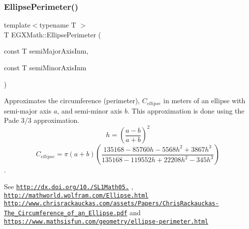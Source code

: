 \subsubsection{\texorpdfstring{Ellipse\+Perimeter()}{EllipsePerimeter()}}
{\footnotesize\ttfamily template$<$typename T $>$ \\
T E\+G\+X\+Math\+::\+Ellipse\+Perimeter (\begin{DoxyParamCaption}\item[{const T}]{semi\+Major\+Axis\+Inm,  }\item[{const T}]{semi\+Minor\+Axis\+Inm }\end{DoxyParamCaption})}



Approximates the circumference (perimeter), $C_{ellipse}$ in meters of an ellipse with semi-\/major axis $a$, and semi-\/minor axis $b$. This approximation is done using the Pade 3/3 approximation. \[ h=\left( \frac{a-b}{a+b} \right)^2 \] \[ C_{ellipse}=\pi (a + b) \left( \frac{135168-85760 h-5568 h^2+ 3867 h^3}{135168-119552 h+ 22208 h^2 - 345h^3} \right) \]. 

See \href{http://dx.doi.org/10.3247/SL1Math05.004}{\tt http\+://dx.\+doi.\+org/10./\+S\+L1\+Math05.} , \href{http://mathworld.wolfram.com/Ellipse.html}{\tt http\+://mathworld.\+wolfram.\+com/\+Ellipse.\+html} \href{http://www.chrisrackauckas.com/assets/Papers/ChrisRackauckas-The_Circumference_of_an_Ellipse.pdf}{\tt http\+://www.\+chrisrackauckas.\+com/assets/\+Papers/\+Chris\+Rackauckas-\/\+The\+\_\+\+Circumference\+\_\+of\+\_\+an\+\_\+\+Ellipse.\+pdf} and \href{https://www.mathsisfun.com/geometry/ellipse-perimeter.html}{\tt https\+://www.\+mathsisfun.\+com/geometry/ellipse-\/perimeter.\+html}

